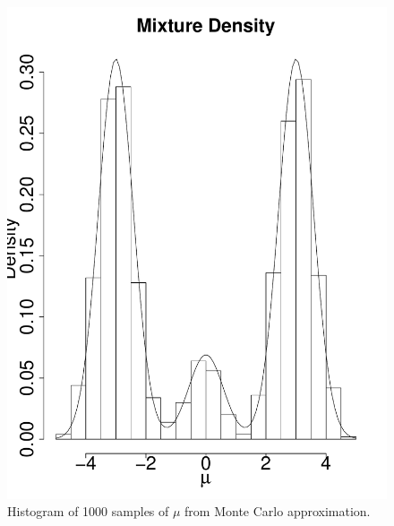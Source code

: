 \documentclass[11pt]{article}
\begin{document}
\begin{enumerate}
\begin{itemize}
\begin{multicols}{2}
\begin{figure}[H]
\begin{center}
\includegraphics[scale=0.3]{figures/MCdensity}
\caption{\label{fig:MCdensity} Histogram of 1000 samples of $\mu$ from Monte Carlo approximation.}
\end{center}
\end{figure}


\end{multicols}
\end{itemize}
\end{enumerate}
\end{document}
